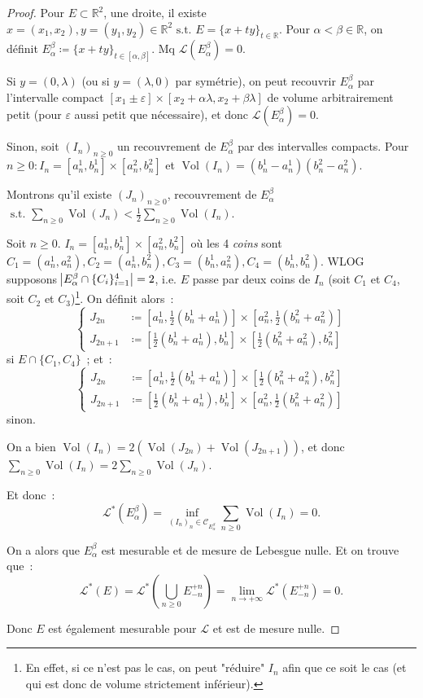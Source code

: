 \documentclass{article}
\newcommand{\pinfty}{{+\infty}}
\newcommand{\st}{\text{ s.t. }}
\newcommand{\R}{{\mathbb R}}
\DeclareMathOperator{\Vol}{Vol}
\begin{document}
\begin{proof} Pour $E \subset \R^2$, une droite, il existe $x = (x_1, x_2), y = (y_1, y_2) \in \R^2 \st E = \{x + ty\}_{t \in \R}$. Pour $\alpha < \beta \in \R$, on définit
$E_\alpha^\beta \coloneqq \{x+ty\}_{t \in [\alpha, \beta]}$. Mq $\mathcal L(E_\alpha^\beta) = 0$.

Si $y = (0, \lambda)$ (ou si $y = (\lambda, 0)$ par symétrie), on peut recouvrir $E_\alpha^\beta$ par l'intervalle compact
$[x_1 \pm \varepsilon] \times [x_2+\alpha\lambda, x_2+\beta\lambda]$ de volume arbitrairement petit (pour $\varepsilon$ aussi petit que nécessaire), et donc
$\mathcal L(E_\alpha^\beta) = 0$.

Sinon, soit $(I_n)_{n \geq 0}$ un recouvrement de $E_\alpha^\beta$ par des intervalles compacts. Pour $n \geq 0 : I_n = [a_n^1, b_n^1] \times [a_n^2, b_n^2]$ et
$\Vol(I_n) = (b_n^1-a_n^1)(b_n^2-a_n^2)$.

Montrons qu'il existe $(J_n)_{n \geq 0}$, recouvrement de $E_\alpha^\beta$ $\st \sum_{n \geq 0}\Vol(J_n) < \frac 12\sum_{n \geq 0}\Vol(I_n)$.

Soit $n \geq 0$. $I_n = [a_n^1, b_n^1] \times [a_n^2, b_n^2]$ où les 4 \textit{coins} sont $C_1 = (a_n^1, a_n^2), C_2 = (a_n^1, b_n^2), C_3 = (b_n^1, a_n^2), C_4 = (b_n^1, b_n^2)$.
WLOG supposons $\abs {E_\alpha^\beta \cap \{C_i\}_{i=1}^4} = 2$, i.e. $E$ passe par deux coins de $I_n$ (soit $C_1$ et $C_4$, soit $C_2$ et $C_3$)\footnote{En effet, si ce n'est pas
le cas, on peut "réduire" $I_n$ afin que ce soit le cas (et qui est donc de volume strictement inférieur).}. On définit alors~:
\[\begin{cases}
	J_{2n}   &\coloneqq [a_n^1, \frac 12(b_n^1 + a_n^1)] \times [a_n^2, \frac 12(b_n^2 + a_n^2)] \\
	J_{2n+1} &\coloneqq [\frac 12(b_n^1 + a_n^1), b_n^1] \times [\frac 12(b_n^2 + a_n^2), b_n^2]
\end{cases}\]
si $E \cap \{C_1, C_4\}$~; et~:
\[\begin{cases}
	J_{2n}   &\coloneqq [a_n^1, \frac 12(b_n^1 + a_n^1)] \times [\frac 12(b_n^2 + a_n^2), b_n^2] \\
	J_{2n+1} &\coloneqq [\frac 12(b_n^1 + a_n^1), b_n^1] \times [a_n^2, \frac 12(b_n^2 + a_n^2)]
\end{cases}\]
sinon.

On a bien $\Vol(I_n) = 2\left(\Vol(J_{2n}) + \Vol(J_{2n+1})\right)$, et donc $\sum_{n \geq 0}\Vol(I_n) = 2\sum_{n \geq 0}\Vol(J_n)$.

Et donc~:
\[\mathcal L^*(E_\alpha^\beta) = \inf_{(I_n)_n \in \mathcal C_{E_\alpha^\beta}}\sum_{n \geq 0}\Vol(I_n) = 0.\]

On a alors que $E_\alpha^\beta$ est mesurable et de mesure de Lebesgue nulle. Et on trouve que~:
\[\mathcal L^*(E) = \mathcal L^*(\bigcup_{n \geq 0}E_{-n}^{+n}) = \lim_{n \to \pinfty}\mathcal L^*(E_{-n}^{+n}) = 0.\]

Donc $E$ est également mesurable pour $\mathcal L$ et est de mesure nulle.
\end{proof}
\end{document}
